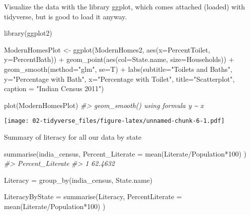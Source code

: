 \documentclass[
]{book}
\newenvironment{Shaded}{\begin{snugshade}}{\end{snugshade}}
\newcommand{\AttributeTok}[1]{\textcolor[rgb]{0.77,0.63,0.00}{#1}}
\newcommand{\CommentTok}[1]{\textcolor[rgb]{0.56,0.35,0.01}{\textit{#1}}}
\newcommand{\DecValTok}[1]{\textcolor[rgb]{0.00,0.00,0.81}{#1}}
\newcommand{\FunctionTok}[1]{\textcolor[rgb]{0.00,0.00,0.00}{#1}}
\newcommand{\NormalTok}[1]{#1}
\newcommand{\OtherTok}[1]{\textcolor[rgb]{0.56,0.35,0.01}{#1}}
\newcommand{\SpecialCharTok}[1]{\textcolor[rgb]{0.00,0.00,0.00}{#1}}
\newcommand{\StringTok}[1]{\textcolor[rgb]{0.31,0.60,0.02}{#1}}
\theoremstyle{definition}
\theoremstyle{definition}
\theoremstyle{definition}
\theoremstyle{definition}
\theoremstyle{remark}
\begin{document}
Visualize the data with the library ggplot, which comes attached (loaded) with tidyverse, but is good to load it anyway.

\begin{Shaded}
\begin{Highlighting}[]
\FunctionTok{library}\NormalTok{(ggplot2)}

\NormalTok{ModernHomesPlot }\OtherTok{\textless{}{-}} \FunctionTok{ggplot}\NormalTok{(ModernHomes2, }\FunctionTok{aes}\NormalTok{(}\AttributeTok{x=}\NormalTok{PercentToilet, }\AttributeTok{y=}\NormalTok{PercentBath)) }\SpecialCharTok{+} 
  \FunctionTok{geom\_point}\NormalTok{(}\FunctionTok{aes}\NormalTok{(}\AttributeTok{col=}\NormalTok{State.name, }\AttributeTok{size=}\NormalTok{Households)) }\SpecialCharTok{+} 
  \FunctionTok{geom\_smooth}\NormalTok{(}\AttributeTok{method=}\StringTok{"glm"}\NormalTok{, }\AttributeTok{se=}\NormalTok{T) }\SpecialCharTok{+} 
  \FunctionTok{labs}\NormalTok{(}\AttributeTok{subtitle=}\StringTok{"Toilets and Baths"}\NormalTok{, }
       \AttributeTok{y=}\StringTok{"Percentage with Bath"}\NormalTok{, }
       \AttributeTok{x=}\StringTok{"Percentage with Toilet"}\NormalTok{, }
       \AttributeTok{title=}\StringTok{"Scatterplot"}\NormalTok{, }
       \AttributeTok{caption =} \StringTok{"Indian Census 2011"}\NormalTok{)}

\FunctionTok{plot}\NormalTok{(ModernHomesPlot)}
\CommentTok{\#\textgreater{} \textasciigrave{}geom\_smooth()\textasciigrave{} using formula \textquotesingle{}y \textasciitilde{} x\textquotesingle{}}
\end{Highlighting}
\end{Shaded}

\texttt{[image: 02-tidyverse\_files/figure-latex/unnamed-chunk-6-1.pdf]}

Summary of literacy for all our data by state

\begin{Shaded}
\begin{Highlighting}[]
\FunctionTok{summarise}\NormalTok{(india\_census, }\AttributeTok{Percent\_Literate =} \FunctionTok{mean}\NormalTok{(Literate}\SpecialCharTok{/}\NormalTok{Population}\SpecialCharTok{*}\DecValTok{100}\NormalTok{) )}
\CommentTok{\#\textgreater{}   Percent\_Literate}
\CommentTok{\#\textgreater{} 1          62.4632}

\NormalTok{Literacy }\OtherTok{=} \FunctionTok{group\_by}\NormalTok{(india\_census, State.name)}

\NormalTok{LiteracyByState }\OtherTok{=} \FunctionTok{summarise}\NormalTok{(Literacy, }\AttributeTok{PercentLiterate =} \FunctionTok{mean}\NormalTok{(Literate}\SpecialCharTok{/}\NormalTok{Population}\SpecialCharTok{*}\DecValTok{100}\NormalTok{) )}
\end{Highlighting}
\end{Shaded}
\end{document}
